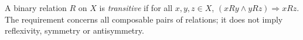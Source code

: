 
A binary relation $R$ on $X$ is \emph{transitive} if for all $x,y,z\in X$, $(xRy\land yRz)\Rightarrow xRz$. The requirement concerns all composable pairs of relations; it does not imply reflexivity, symmetry or antisymmetry.
